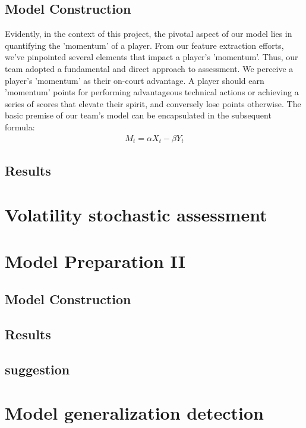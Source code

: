 \documentclass[12pt]{article}  %
\begin{document}
\subsection{Model Construction}
Evidently, in the context of this project, 
the pivotal aspect of our model lies in quantifying the 'momentum' of a player. From our feature extraction efforts, 
we've pinpointed several elements that impact a player's 'momentum'. Thus, our team adopted a fundamental and direct approach to assessment.
 We perceive a player's 'momentum' as their on-court advantage. A player should earn 'momentum' points 
 for performing advantageous technical actions or achieving a series of scores that elevate their spirit, 
and conversely lose points otherwise. The basic premise of our team's model can be encapsulated in the subsequent formula:
\begin{align} %
    M_t = \alpha X_t - \beta Y_t
\end{align}

\subsection{Results}

\section{Volatility stochastic assessment}

\section{Model Preparation II}

\subsection{Model Construction}

\subsection{Results}

\subsection{suggestion}

\section{Model generalization detection}
\end{document}
